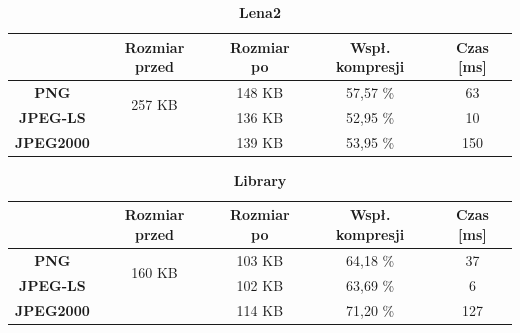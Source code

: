 \begin{table}[!h]
	\centering
	\caption{\textbf{Lena2}}
	\label{my-label}
	\begin{tabular}{|c|c|c|c|c|}                                             
		\hline
		& \textbf{Rozmiar przed} & \textbf{Rozmiar po} & \textbf{Wspł. kompresji} & \textbf{Czas {[}ms{]}} \\ \hline 
		\textbf{PNG}      &          \multicolumn{1}{c|}{\multirow{2}{*}{257 KB}}             &      148 KB               &       57,57 \%                  &           63                   \\\cline{3-5}
		\textbf{JPEG-LS}  &                        &        136 KB             &         52,95 \%                &       10                   \\\cline{3-5}
		\textbf{JPEG2000} &                        &      139 KB               &          53,95 \%               &       150               \\ \hline
	\end{tabular}
\end{table}

\begin{table}[!h]
	\centering
	\caption{\textbf{Library}}
	\label{my-label}
	\begin{tabular}{|c|c|c|c|c|}                                             
		\hline
		& \textbf{Rozmiar przed} & \textbf{Rozmiar po} & \textbf{Wspł. kompresji} & \textbf{Czas {[}ms{]}} \\ \hline 
		\textbf{PNG}      &          \multicolumn{1}{c|}{\multirow{2}{*}{160 KB}}             &      103 KB               &    64,18 \%                     &           37                  \\\cline{3-5}
		\textbf{JPEG-LS}  &                        &     102 KB                &        63,69 \%                 &           6               \\\cline{3-5}
		\textbf{JPEG2000} &                        &     114 KB                &        71,20 \%                 &        127              \\ \hline
	\end{tabular}
\end{table}

